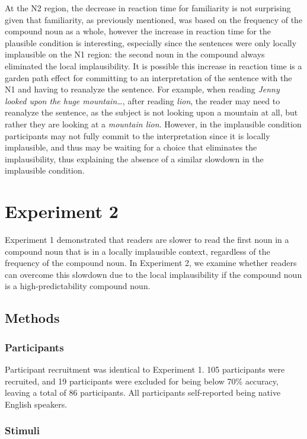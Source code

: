 \documentclass[
  12pt,
  letterpaper,
]{scrreport}
\begin{document}
At the N2 region, the decrease in reaction time for familiarity is not
surprising given that familiarity, as previously mentioned, was based on
the frequency of the compound noun as a whole, however the increase in
reaction time for the plausible condition is interesting, especially
since the sentences were only locally implausible on the N1 region: the
second noun in the compound always eliminated the local implausibility.
It is possible this increase in reaction time is a garden path effect
for committing to an interpretation of the sentence with the N1 and
having to reanalyze the sentence. For example, when reading \emph{Jenny
looked upon the huge mountain\ldots{}}, after reading \emph{lion}, the
reader may need to reanalyze the sentence, as the subject is not looking
upon a mountain at all, but rather they are looking at a \emph{mountain
lion}. However, in the implausible condition participants may not fully
commit to the interpretation since it is locally implausible, and thus
may be waiting for a choice that eliminates the implausibility, thus
explaining the absence of a similar slowdown in the implausible
condition.

\section{Experiment 2}\label{experiment-2}

Experiment 1 demonstrated that readers are slower to read the first noun
in a compound noun that is in a locally implausible context, regardless
of the frequency of the compound noun. In Experiment 2, we examine
whether readers can overcome this slowdown due to the local
implausibility if the compound noun is a high-predictability compound
noun.

\subsection{Methods}\label{methods-1}

\subsubsection{Participants}\label{participants-1}

Participant recruitment was identical to Experiment 1. 105 participants
were recruited, and 19 participants were excluded for being below 70\%
accuracy, leaving a total of 86 participants. All participants
self-reported being native English speakers.

\subsubsection{Stimuli}\label{stimuli-1}
\end{document}

